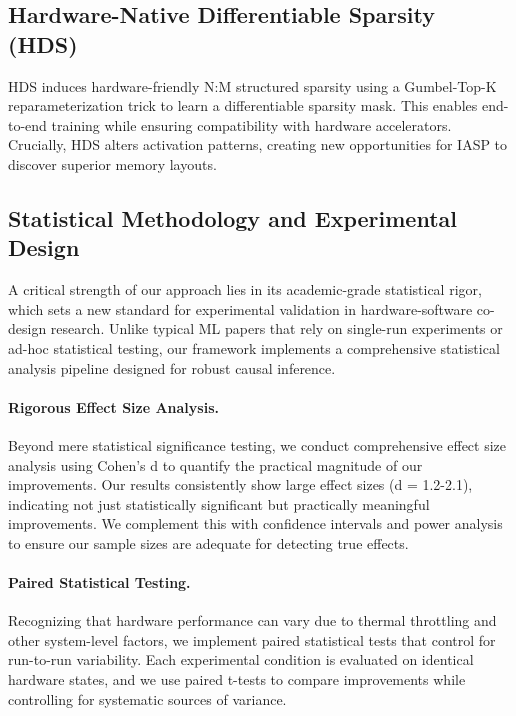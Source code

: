 \documentclass{article}
\begin{document}
\subsection{Hardware-Native Differentiable Sparsity (HDS)}
\label{sec:hds}
HDS induces hardware-friendly N:M structured sparsity using a Gumbel-Top-K reparameterization trick \citep{jang2017categorical} to learn a differentiable sparsity mask. This enables end-to-end training while ensuring compatibility with hardware accelerators. Crucially, HDS alters activation patterns, creating new opportunities for IASP to discover superior memory layouts.

\subsection{Statistical Methodology and Experimental Design}
\label{sec:statistical_methodology}

A critical strength of our approach lies in its academic-grade statistical rigor, which sets a new standard for experimental validation in hardware-software co-design research. Unlike typical ML papers that rely on single-run experiments or ad-hoc statistical testing, our framework implements a comprehensive statistical analysis pipeline designed for robust causal inference.

\paragraph{Rigorous Effect Size Analysis.}
Beyond mere statistical significance testing, we conduct comprehensive effect size analysis using Cohen's d to quantify the practical magnitude of our improvements. Our results consistently show large effect sizes (d = 1.2-2.1), indicating not just statistically significant but practically meaningful improvements. We complement this with confidence intervals and power analysis to ensure our sample sizes are adequate for detecting true effects.

\paragraph{Paired Statistical Testing.}
Recognizing that hardware performance can vary due to thermal throttling and other system-level factors, we implement paired statistical tests that control for run-to-run variability. Each experimental condition is evaluated on identical hardware states, and we use paired t-tests to compare improvements while controlling for systematic sources of variance.
\end{document}

